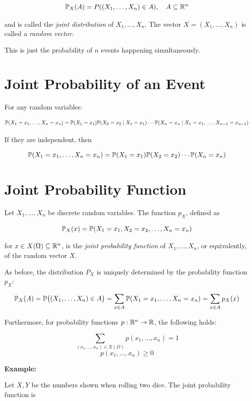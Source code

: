 \[
    \mathbb{P}_X(A) = P((X_1, \ldots, X_n) \in A), \quad A \subseteq \mathbb{R}^n
\]

and is called the \emph{joint distribution} of \( X_1, \ldots, X_n \).
The vector \( X = (X_1, \ldots, X_n) \) is called a \emph{random vector}.

This is just the probability of \(n\) events happening simultaneously.

\section{Joint Probability of an Event}

For any random variables:

\[
    \mathbb{P}(X_1 = x_1, \ldots, X_n = x_n) = \mathbb{P}(X_1 = x_1) \mathbb{P}(X_2 = x_2 \mid X_1 = x_1) \cdots \mathbb{P}(X_n = x_n \mid X_1 = x_1, \ldots, X_{n - 1} = x_{n - 1})
\]

If they are independent, then

\[
    \mathbb{P}(X_1 = x_1, \ldots, X_n = x_n) = \mathbb{P}(X_1 = x_1) \mathbb{P}(X_2 = x_2) \cdots \mathbb{P}(X_n = x_n)
\]

\section{Joint Probability Function}

Let \( X_1, \ldots, X_n \) be discrete random variables.
The function \( p_X \), defined as

\[
    \mathbb{P}_X(x) = \mathbb{P}(X_1 = x_1, X_2 = x_2, \ldots, X_n = x_n)
\]

for \( x \in X(\Omega) \subseteq \mathbb{R}^n \), is the \emph{joint probability function} of \( X_1, \ldots, X_n \),
or equivalently, of the random vector \( X \).

As before, the distribution \( P_X \) is uniquely determined by the probability function \( p_X \):

\[
    \mathbb{P}_X(A) = \mathbb{P}\big((X_1, \ldots, X_n) \in A\big)
           = \sum_{x \in A} \mathbb{P}(X_1 = x_1, \ldots, X_n = x_n)
           = \sum_{x \in A} p_X(x)
\]

Furthermore, for probability functions \( p : \mathbb{R}^n \to \mathbb{R} \), the following holds:

\[
    \sum_{(x_1, \ldots, x_n) \in X(\Omega)} p(x_1, \ldots, x_n) = 1
\]
\[
    p(x_1, \ldots, x_n) \ge 0
\]

\textbf{Example:}

Let \( X, Y \) be the numbers shown when rolling two dice.
The joint probability function is

